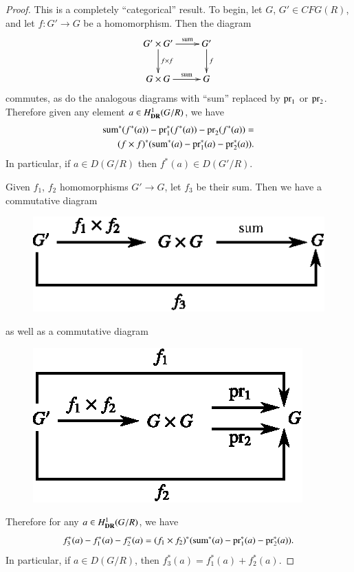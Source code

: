 \begin{proof}
This is a completely ``categorical'' result. To begin, let $G$, $G'\in CFG(R)$, and let $f:G'\to G$ be a homomorphism. Then the diagram
\[
\xymatrix{
G'\times G'\ar[r]^-{\text{sum}}\ar[d]^-{f\times f} & G'\ar[d]^-{f}\\
G\times G\ar[r]^-{\text{sum}} & G
}
\]
commutes, as do the analogous diagrams with ``sum'' replaced by $\operatorname{pr}_{1}$ or $\operatorname{pr}_{2}$. Therefore given any element $a\in H^{1}_{\mathbf{DR}}(G/R)$, we have
\begin{align*}
\text{sum}^{*}(f^{*}(a))-\operatorname{pr}^{*}_{1}(f^{*}(a))-\operatorname{pr}_{2}(f^{*}(a))=\\
(f\times f)^{*}(\text{sum}^{*}(a)-\operatorname{pr}^{*}_{1}(a)-\operatorname{pr}^{*}_{2}(a)).
\end{align*}
In particular, if $a\in D(G/R)$ then $f^{*}(a)\in D(G'/R)$.

Given $f_{1}$, $f_{2}$ homomorphisms $G'\to G$, let $f_{3}$ be their sum. Then we have a commutative diagram
\begin{figure}[H]
\centering
\includegraphics{chap6/fig3.eps}
\end{figure}\pageoriginale
as well as a commutative diagram
\begin{figure}[H]
\centering
\includegraphics{chap6/fig4.eps}
\end{figure}
Therefore for any $a\in H^{1}_{\mathbf{DR}}(G/R)$, we have
$$
f^{*}_{3}(a)-f^{*}_{1}(a)-f^{*}_{2}(a)=(f_{1}\times f_{2})^{*}(\text{sum}^{*}(a)-\operatorname{pr}_{1}^{*}(a)-\operatorname{pr}_{2}^{*}(a)).
$$
In particular, if $a\in D(G/R)$, then $f^{*}_{3}(a)=f^{*}_{1}(a)+f^{*}_{2}(a)$.
\end{proof}

